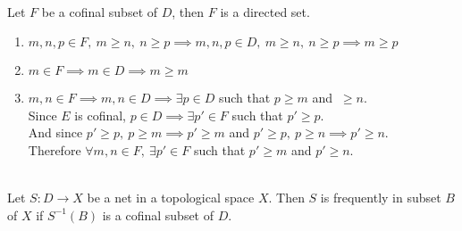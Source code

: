 \begin{remark}\cite[10.1.8]{joshi}\\
	Let $F$ be a cofinal subset of $D$, then $F$ is a directed set.
	\begin{enumerate}
		\item $m,n,p \in F,\ m \ge n,\ n \ge p \implies m,n,p \in D,\ m \ge n,\ n \ge p \implies m \ge p$
		\item $m \in F \implies m \in D \implies m \ge m$
		\item $m,n \in F \implies m,n \in D \implies \exists p \in D$ such that $p \ge m$ and $\ \ge n$.\\
			Since $E$ is cofinal, $p \in D \implies \exists p' \in F$ such that $p' \ge p$.\\
			And since $p' \ge p,\ p \ge m \implies p' \ge m$ and $p' \ge p,\ p \ge n \implies p' \ge n$.\\
			Therefore $\forall m,n \in F,\ \exists p' \in F$ such that $p' \ge m$ and $p' \ge n$.
	\end{enumerate}
\end{remark}

\begin{definition}\cite[10.1.7]{joshi}\\
	Let $S : D \to X$ be a net in a topological space $X$. Then $S$ is frequently in subset $B$ of $X$ if $S^{-1}(B)$ is a cofinal subset of $D$.
\end{definition}

